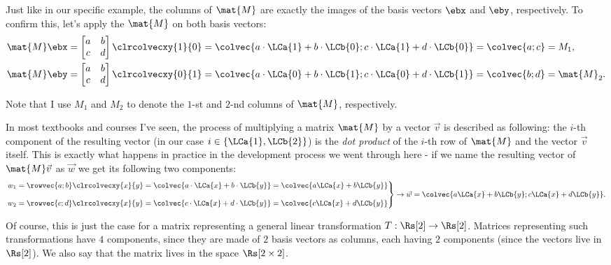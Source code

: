 Just like in our specific example, the columns of $\mat{M}$ are exactly the images of the basis vectors $\ebx$ and $\eby$, respectively. To confirm this, let's apply the $\mat{M}$ on both basis vectors:
\begin{equation}
	\begin{aligned}
		\mat{M}\ebx & =
		\begin{bmatrix}
			a & b \\
			c & d
		\end{bmatrix}\clrcolvecxy{1}{0} = \colvec{a\cdot\LCa{1}+b\cdot\LCb{0};c\cdot\LCa{1}+d\cdot\LCb{0}} = \colvec{a;c} = M_{1}, \\
		\mat{M}\eby & =
		\begin{bmatrix}
			a & b \\
			c & d
		\end{bmatrix}\clrcolvecxy{0}{1} = \colvec{a\cdot\LCa{0}+b\cdot\LCb{1};c\cdot\LCa{0}+d\cdot\LCb{1}} = \colvec{b;d} = \mat{M}_{2}.
		\label{eq:applying a general 2x2 matrix on basis vectors}
	\end{aligned}
\end{equation}

Note that I use $M_{1}$ and $M_{2}$ to denote the $1$-st and $2$-nd columns of $\mat{M}$, respectively.

In most textbooks and courses I've seen, the process of multiplying a matrix $\mat{M}$ by a vector $\vec{v}$ is described as following: the $i$-th component of the resulting vector (in our case $i\in\left\{\LCa{1},\LCb{2}\right\}$) is the \textit{dot product} of the $i$-th row of $\mat{M}$ and the vector $\vec{v}$ itself. This is exactly what happens in practice in the development process we went through here - if we name the resulting vector of $\mat{M}\vec{v}$ as $\vec{w}$ we get its following two components:
\begin{equation}
	\left.
	\begin{aligned}
		w_{1} & = \rowvec{a;b}\clrcolvecxy{x}{y} = \colvec{a\cdot\LCa{x}+b\cdot\LCb{y}} = \colvec{a\LCa{x}+b\LCb{y}} \\[2ex]
		w_{2} & = \rowvec{c;d}\clrcolvecxy{x}{y} = \colvec{c\cdot\LCa{x}+d\cdot\LCb{y}} = \colvec{c\LCa{x}+d\LCb{y}}
		\label{eq:}
	\end{aligned}
	\right\} \rightarrow \vec{w} = \colvec{a\LCa{x}+b\LCb{y};c\LCa{x}+d\LCb{y}}.
\end{equation}

Of course, this is just the case for a matrix representing a general linear transformation $T:\Rs[2]\to\Rs[2]$. Matrices representing such transformations have $4$ components, since they are made of $2$ basis vectors as columns, each having $2$ components (since the vectors live in $\Rs[2]$). We also say that the matrix lives in the space $\Rs[2\times2]$.

